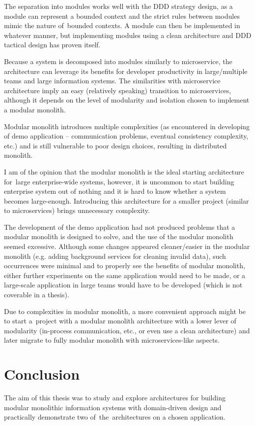 The separation into modules works well with the DDD strategy design, as a module can represent a bounded context and the strict rules between modules mimic the nature of~bounded contexts. A module can then be implemented in whatever manner, but implementing modules using a clean architecture and DDD tactical design has proven itself.

Because a system is decomposed into modules similarly to microservice, the architecture can leverage its benefits for developer productivity in large/multiple teams and large information systems. The similarities with microservice architecture imply an easy (relatively speaking) transition to microservices, although it depends on the level of modularity and isolation chosen to implement a modular monolith.

Modular monolith introduces multiple complexities (as encountered in developing of demo application -- communication problems, eventual consistency complexity, etc.) and is still vulnerable to poor design choices, resulting in distributed monolith.

I am of the opinion that the modular monolith is the ideal starting architecture for~large enterprise-wide systems, however, it is uncommon to start building enterprise system out of nothing and it is hard to know whether a system becomes large-enough. Introducing this architecture for a smaller project (similar to microservices) brings unnecessary complexity.

The development of the demo application had not produced problems that a modular monolith is designed to solve, and the use of the modular monolith seemed excessive. Although some changes appeared cleaner/easier in the modular monolith (e.g. adding background services for cleaning invalid data), such occurrences were minimal and to properly see the benefits of modular monolith, either further experiments on the same application would need to be made, or a large-scale application in large teams would have to be developed (which is not coverable in a thesis).

Due to complexities in modular monolith, a more convenient approach might be to start a~project with a modular monolith architecture with a lower lever of modularity (in-process communication, etc., or even use a clean architecture) and later migrate to fully modular monolith with microservices-like aspects.

\chapter{Conclusion}
\label{chapter_conclusion}
\vspace{-2pt}
The aim of this thesis was to study and explore architectures for building modular monolithic information systems with domain-driven design and practically demonstrate two of~the~architectures on a chosen application.

